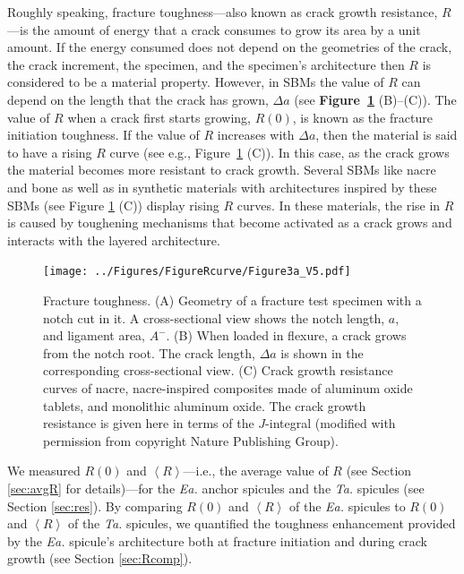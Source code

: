 \documentclass[12pt,onecolumn]{article}
\makeatletter
\newcommand{\TA}{\textit{Ta.\@}\xspace}
\newcommand{\EA}{\textit{Ea.\@}\xspace}
\makeatother
\begin{document}
\begin{bibunit}
Roughly speaking, fracture toughness---also known as crack growth resistance, $R$---is the amount of energy that a crack consumes to grow its area by a unit amount. If the energy consumed does not depend on the geometries of the crack, the crack increment, the specimen, and the specimen's architecture then $R$ is considered to be a material property. However, in SBMs the value of $R$ can depend on the length that the crack has grown, $\Delta a$ (see {\bf Figure~\ref{fig:Rcurve}} (B)--(C)). The value of $R$ when a crack first starts growing, $R(0)$, is known as the fracture initiation toughness. If the value of $R$ increases with $\Delta a$, then the material is said to have a rising $R$ curve (see e.g., Figure~\ref{fig:Rcurve} (C)). In this case, as the crack grows the material becomes more resistant to crack growth. Several SBMs like nacre and bone  \cite{barthelat2007experimental,rabiei2010failure,nalla2005mechanistic,launey2009mechanistic} as well as in synthetic materials with architectures inspired by these SBMs (see Figure \ref{fig:Rcurve} (C)) \cite{ritchie2011conflicts} display rising $R$ curves. In these materials, the rise in $R$ is caused by toughening mechanisms that become activated as a crack grows and interacts with the layered architecture.
%
			\begin{figure}[ht!]
			\centering
			\texttt{[image: ../Figures/FigureRcurve/Figure3a\_V5.pdf]}
			\caption{Fracture toughness. (A) Geometry of a fracture test specimen with a notch cut in it. A cross-sectional view shows the notch length, $a$, and ligament area, $A^-$. (B) When loaded in flexure, a crack grows from the notch root. The crack length, $\Delta a$ is shown in the corresponding cross-sectional view. (C) Crack growth resistance curves of nacre, nacre-inspired composites made of aluminum oxide tablets, and monolithic aluminum oxide. The crack growth resistance is given here in terms of the $J$-integral (modified with permission from \cite{ritchie2011conflicts} copyright Nature Publishing Group).}
			\label{fig:Rcurve}
			\end{figure}

We measured $R(0)$ and $\left< R \right>$---i.e., the average value of $R$ (see Section \ref{sec:avgR} for details)---for the \EA anchor spicules and the \TA spicules (see Section \ref{sec:res}). By comparing $R(0)$ and $\left< R \right>$ of the \EA spicules to $R(0)$ and $\left< R \right>$ of the \TA spicules, we quantified the toughness enhancement provided by the \EA spicule's architecture both at fracture initiation and during crack growth (see Section \ref{sec:Rcomp}).


\end{bibunit}
\end{document}
